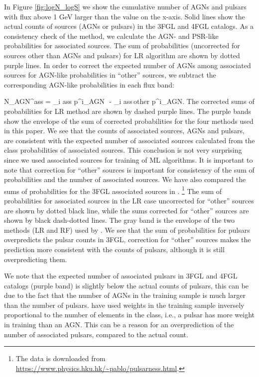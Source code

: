 In Figure \ref{fig:logN_logS} we show the cumulative number of AGNs and pulsars with flux above 1 GeV larger than the
value on the x-axis.
Solid lines show the actual counts of sources (AGNs or pulsars) in the 3FGL and 4FGL catalogs.
As a consistency check of the method, we calculate the AGN- and PSR-like probabilities for associated sources.
The sum of probabilities (uncorrected for sources other than AGNs and pulsars) for LR algorithm are shown by dotted purple lines.
In order to correct the expected number of AGNs among associated sources for AGN-like probabilities in ``other'' sources, 
we subtract the corresponding AGN-like probabilities in each flux band:

\be
{}
N_{\rm AGN}^{\rm ass}  = \sum_{i \in \rm ass} p^i_{\rm AGN}\,\, - \sum_{i \in \rm ass\,other} p^i_{\rm AGN}.
\ee
The corrected sums of probabilities for LR method are shown by dashed purple lines.
The purple bands show the envelope of the sum of corrected probabilities for the four methods used in this paper.
We see that the counts of associated sources, AGNs and pulsars, are consistent with the expected number of associated sources
calculated from the class probabilities of associated sources.
This conclusion is not very surprising since we used associated sources for training of ML algorithms.
It is important to note that correction for ``other'' sources is important for consistency of the sum of probabilities and the number of associated sources.
We have also compared the sums of probabilities for the 3FGL associated sources in \cite{2016ApJ...820....8S}.%
\footnote{The data is downloaded from \url{https://www.physics.hku.hk/~pablo/pulsarness.html}.}
The sum of probabilities for associated sources in the LR case uncorrected for ``other'' sources are shown by dotted black line,
while the sums corrected for ``other'' sources are shown by black dash-dotted lines.
The gray band is the envelope of the two methods (LR and RF) used by \cite{2016ApJ...820....8S}.
We see that the sum of probabilities for pulsars overpredicts the pulsar counts in 3FGL, correction for ``other'' sources makes the prediction 
more consistent with the counts of pulsars, although it is still overpredicting them.

We note that the expected number of associated pulsars in 3FGL and 4FGL catalogs (purple band) is slightly below the 
actual counts of pulsars, this can be due to the fact that the number of AGNs in the training sample is much larger than the number of pulsars.
\cite{2016ApJ...820....8S} have used weights in the training sample inversely proportional to the number of elements in the class,
i.e., a pulsar has more weight in training than an AGN.
This can be a reason for an overprediction of the number of associated pulsars, compared to the actual count.


